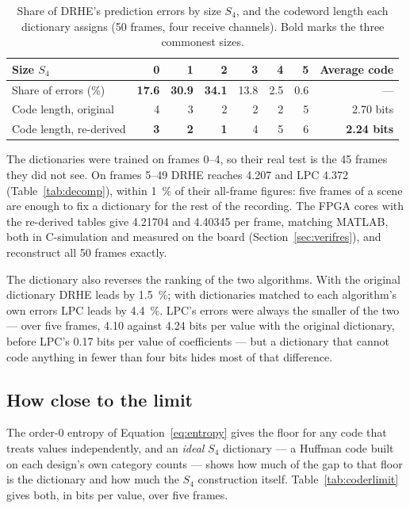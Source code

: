 \begin{table}[htbp]
\centering
\caption[What the re-derived dictionary changes]{Share of DRHE's prediction
errors by size $S_4$, and the codeword length each dictionary assigns
(50 frames, four receive channels). Bold marks the three commonest sizes.}
\label{tab:dictshare}
\small
\begin{tabular}{@{}lrrrrrrr@{}}
\toprule
Size $S_4$ & 0 & 1 & 2 & 3 & 4 & 5 & Average code\\
\midrule
Share of errors (\%)      & \textbf{17.6} & \textbf{30.9} & \textbf{34.1} & 13.8 & 2.5 & 0.6 & ---\\
Code length, original     & 4 & 3 & 2 & 2 & 2 & 5 & \num{2.70} bits\\
Code length, re-derived   & \textbf{3} & \textbf{2} & \textbf{1} & 4 & 5 & 6 & \textbf{\num{2.24} bits}\\
\bottomrule
\end{tabular}
\end{table}

The dictionaries were trained on frames 0--4, so their real test is the 45
frames they did not see. On frames 5--49 DRHE reaches \num{4.207} and LPC
\num{4.372} (Table~\ref{tab:decomp}), within \SI{1}{\percent} of their
all-frame figures: five frames of a scene are enough to fix a dictionary for
the rest of the recording. The FPGA cores with the re-derived tables give \num{4.21704} and
\num{4.40345} per frame, matching MATLAB, both in C-simulation and measured on
the board (Section~\ref{sec:verifres}), and reconstruct all 50 frames
exactly.

The dictionary also reverses the ranking of the two algorithms. With the
original dictionary DRHE leads by \SI{1.5}{\percent}; with dictionaries matched
to each algorithm's own errors LPC leads by \SI{4.4}{\percent}. LPC's errors
were always the smaller of the two --- over five frames, \num{4.10} against
\num{4.24} bits per value with the original dictionary, before LPC's \num{0.17}
bits per value of coefficients --- but a dictionary that cannot code anything in fewer than four
bits hides most of that difference.

\subsection{How close to the limit}
\label{sec:coderlimit}

The order-0 entropy of Equation~\eqref{eq:entropy} gives the floor for any code
that treats values independently, and an \emph{ideal} $S_4$ dictionary --- a
Huffman code built on each design's own category counts --- shows how much of the
gap to that floor is the dictionary and how much the $S_4$ construction itself.
Table~\ref{tab:coderlimit} gives both, in bits per value, over five frames.


